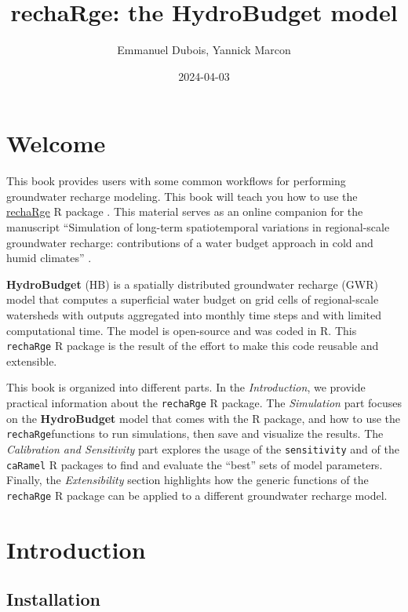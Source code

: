 \documentclass[
]{book}
\title{rechaRge: the HydroBudget model}
\author{Emmanuel Dubois, Yannick Marcon}
\date{2024-04-03}
\begin{document}
\maketitle

{
\setcounter{tocdepth}{1}
\tableofcontents
}
\hypertarget{welcome}{%
\chapter*{Welcome}\label{welcome}}

This book provides users with some common workflows for performing groundwater recharge modeling. This book will teach you how to use the \href{https://github.com/gwrecharge/rechaRge}{rechaRge} R package \citep{R-rechaRge}. This material serves as an online companion for the manuscript ``Simulation of long-term spatiotemporal variations in regional-scale groundwater recharge: contributions of a water budget approach in cold and humid climates'' \citep{hess-25-6567-2021}.

\textbf{HydroBudget} (HB) is a spatially distributed groundwater recharge (GWR) model that computes a superficial water budget on grid cells of regional-scale watersheds with outputs aggregated into monthly time steps and with limited computational time. The model is open-source and was coded in R. This \texttt{rechaRge} R package is the result of the effort to make this code reusable and extensible.

This book is organized into different parts. In the \emph{Introduction}, we provide practical information about the \texttt{rechaRge} R package. The \emph{Simulation} part focuses on the \textbf{HydroBudget} model that comes with the R package, and how to use the \texttt{rechaRge}functions to run simulations, then save and visualize the results. The \emph{Calibration and Sensitivity} part explores the usage of the \texttt{sensitivity} and of the \texttt{caRamel} R packages to find and evaluate the ``best'' sets of model parameters. Finally, the \emph{Extensibility} section highlights how the generic functions of the \texttt{rechaRge} R package can be applied to a different groundwater recharge model.

\hypertarget{intro}{%
\chapter{Introduction}\label{intro}}

\hypertarget{installation}{%
\section{Installation}\label{installation}}
\end{document}
